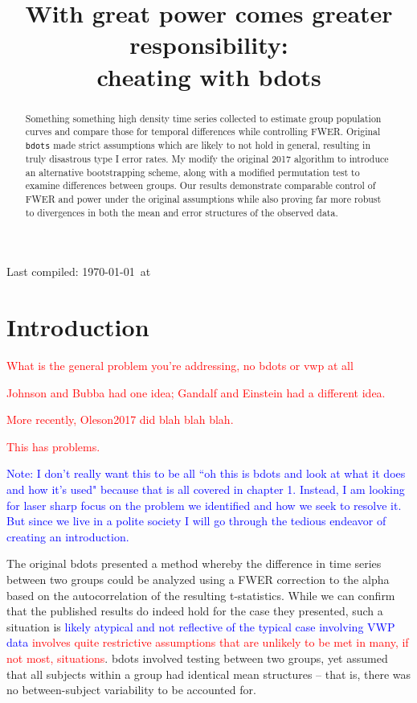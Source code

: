 \documentclass{article}
\title{With great power comes greater responsibility: \\
\large cheating with bdots}
\date{}
\newcommand{\xt}{\texttt}
\providecommand{\pb}[1]{\textcolor{red}{#1}}
\providecommand{\cn}[1]{\textcolor{blue}{#1}}
\begin{document}

\maketitle

Last compiled: \today \  at \currenttime

%

\begin{abstract}
Something something high density time series collected to estimate group population curves and compare those for temporal differences while controlling FWER. Original \xt{bdots} made strict assumptions which are likely to not hold in general, resulting in truly disastrous type I error rates. My modify the original 2017 algorithm to introduce an alternative bootstrapping scheme, along with a modified permutation test to examine differences between groups. Our results demonstrate comparable control of FWER and power under the original assumptions while also proving far more robust to divergences in both the mean and error structures of the observed data.
\end{abstract}

\section{Introduction}

\pb{What is the general problem you're addressing, no bdots or vwp at all}

\pb{Johnson and Bubba had one idea; Gandalf and Einstein had a different idea.}

\pb{More recently, Oleson2017 did blah blah blah.}

\pb{This has problems.}

\cn{Note: I don't really want this to be all ``oh this is bdots and look at what it does and how it's used" because that is all covered in chapter 1. Instead, I am looking for laser sharp focus on the problem we identified and how we seek to resolve it. But since we live in a polite society I will go through the tedious endeavor of creating an introduction.}


The original bdots presented a method whereby the difference in time series between two groups could be analyzed using a FWER correction to the alpha based on the autocorrelation of the resulting t-statistics. While we can confirm that the published results do indeed hold for the case they presented, such a situation is \cn{likely atypical and not reflective of the typical case involving VWP data} \pb{involves quite restrictive assumptions that are unlikely to be met in many, if not most, situations}. bdots involved testing between two groups, yet assumed that all subjects within a group had identical mean structures -- that is, there was no between-subject variability to be accounted for.
\end{document}
